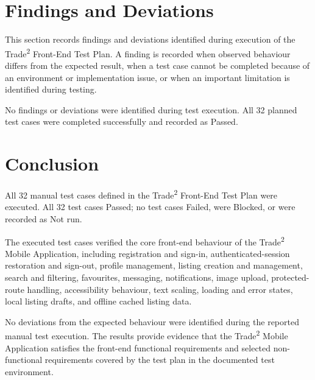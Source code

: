 \documentclass[fleqn,12pt]{article}
\newcommand{\tradesq}{Trade\textsuperscript{2}}
\begin{document}
\newpage
\section{Findings and Deviations}\label{sec:hd-testreport-findings}

This section records findings and deviations identified during execution of the \tradesq{} Front-End Test Plan. A finding is recorded when observed behaviour differs from the expected result, when a test case cannot be completed because of an environment or implementation issue, or when an important limitation is identified during testing.

No findings or deviations were identified during test execution. All 32 planned test cases were completed successfully and recorded as Passed.

\newpage
\section{Conclusion}\label{sec:hd-testreport-conclusion}

All 32 manual test cases defined in the \tradesq{} Front-End Test Plan were executed. All 32 test cases Passed; no test cases Failed, were Blocked, or were recorded as Not run.

The executed test cases verified the core front-end behaviour of the \tradesq{} Mobile Application, including registration and sign-in, authenticated-session restoration and sign-out, profile management, listing creation and management, search and filtering, favourites, messaging, notifications, image upload, protected-route handling, accessibility behaviour, text scaling, loading and error states, local listing drafts, and offline cached listing data.

No deviations from the expected behaviour were identified during the reported manual test execution. The results provide evidence that the \tradesq{} Mobile Application satisfies the front-end functional requirements and selected non-functional requirements covered by the test plan in the documented test environment.

\newpage
\printbibliography
\end{document}
